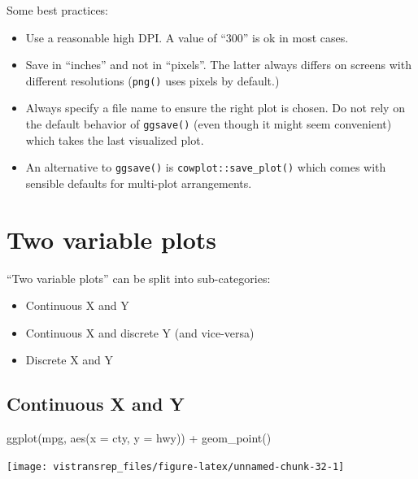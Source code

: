 \documentclass[]{book}
\newenvironment{Shaded}{}{}
\newcommand{\DataTypeTok}[1]{#1}
\newcommand{\KeywordTok}[1]{\textcolor[rgb]{0.00,0.00,1.00}{#1}}
\newcommand{\NormalTok}[1]{#1}
\newcommand{\OperatorTok}[1]{#1}
\newcommand{\StringTok}[1]{\textcolor[rgb]{0.00,0.50,0.50}{#1}}
\begin{document}
Some best practices:

\begin{itemize}
\item
  Use a reasonable high DPI. A value of ``300'' is ok in most cases.
\item
  Save in ``inches'' and not in ``pixels''. The latter always differs on screens with different resolutions (\texttt{png()} uses pixels by default.)
\item
  Always specify a file name to ensure the right plot is chosen. Do not rely on the default behavior of \texttt{ggsave()} (even though it might seem convenient) which takes the last visualized plot.
\item
  An alternative to \texttt{ggsave()} is \texttt{cowplot::save\_plot()} which comes with sensible defaults for multi-plot arrangements.
\end{itemize}

\hypertarget{two-variable-plots}{%
\section{Two variable plots}\label{two-variable-plots}}

``Two variable plots'' can be split into sub-categories:

\begin{itemize}
\item
  Continuous X and Y
\item
  Continuous X and discrete Y (and vice-versa)
\item
  Discrete X and Y
\end{itemize}

\hypertarget{continuous-x-and-y}{%
\subsection{Continuous X and Y}\label{continuous-x-and-y}}

\begin{Shaded}
\begin{Highlighting}[]
\KeywordTok{ggplot}\NormalTok{(mpg, }\KeywordTok{aes}\NormalTok{(}\DataTypeTok{x =}\NormalTok{ cty, }\DataTypeTok{y =}\NormalTok{ hwy)) }\OperatorTok{+}
\StringTok{  }\KeywordTok{geom_point}\NormalTok{()}
\end{Highlighting}
\end{Shaded}

\begin{flushright}\texttt{[image: vistransrep\_files/figure-latex/unnamed-chunk-32-1]} \end{flushright}
\end{document}
